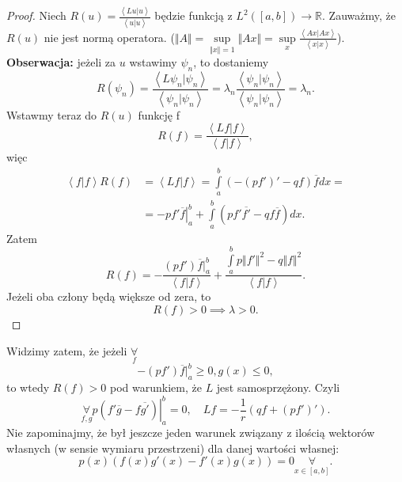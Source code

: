 \documentclass[../main.tex]{subfiles}
\begin{document}
\begin{proof}
		Niech $R(u) = \frac{\left<Lu|u \right>}{\left<u|u \right>}$ będzie funkcją z $L^2\left( \left[ a,b \right]  \right) \to \mathbb{R}$. Zauważmy, że $R(u)$ nie jest normą operatora.
		($\Vert A \Vert = \underset{\Vert x \Vert = 1}{\sup} \Vert Ax \Vert = \underset{x}{\sup} \frac{\left<Ax|Ax \right>}{\left<x|x \right>}$).\\
		\textbf{Obserwacja:} jeżeli za $u$ wstawimy $\psi_n$, to dostaniemy
		\[
				R(\psi_n) = \frac{\left<L\psi_n|\psi_n \right>}{\left<\psi_n|\psi_n \right>} = \lambda_n \frac{\left<\psi_n|\psi_n \right>}{\left<\psi_n|\psi_n \right>} = \lambda_n
		.\]
		Wstawmy teraz do $R(u)$ funkcję f
		\[
				R(f) = \frac{\left<Lf|f \right>}{\left<f|f \right>}
		,\]
		więc
		\begin{align*}
				\left<f|f \right>R(f) &= \left<Lf|f \right> = \int\limits_a^b \left( -\left( pf' \right) ' - qf \right) \overline{f} dx = \\
				&= -pf'\left.\overline{f} \right|_a^b + \int\limits_a^b \left( pf' \overline{f'} - qf\overline{f}  \right) dx
		.\end{align*}
		Zatem
		\[
				R(f) = -\frac{(pf')\overline{f}|_a^b}{\left<f|f \right>} + \frac{\int\limits_a^b p \Vert f' \Vert ^2 - q\Vert f \Vert ^2}{\left<f|f \right>}
		.\]
		Jeżeli oba człony będą większe od zera, to
		\[
				R(f) > 0 \implies \lambda > 0
		.\]
\end{proof}
		Widzimy zatem, że jeżeli $\underset{f}{\forall} $
		\[
				-\left( pf'\right)\overline{f}|_a^b  \ge 0,g(x) \le 0
		,\]
		to wtedy $R(f) > 0$ pod warunkiem, że $L$ jest samosprzężony. Czyli
		\[
				\underset{f,g}{\forall} p\left.\left( f'\overline{g} - f \overline{g'}  \right) \right|_a^b = 0,\quad Lf = -\frac{1}{r}\left( qf + \left( pf' \right)'  \right)
		.\]
		Nie zapominajmy, że był jeszcze jeden warunek związany z ilością wektorów własnych (w sensie wymiaru przestrzeni) dla danej wartości własnej:
		\[
				p(x)\left( f(x)g'(x) - f'(x)g(x) \right) = 0 \underset{x\in [a,b]}{\forall}
		.\]
\end{document}
